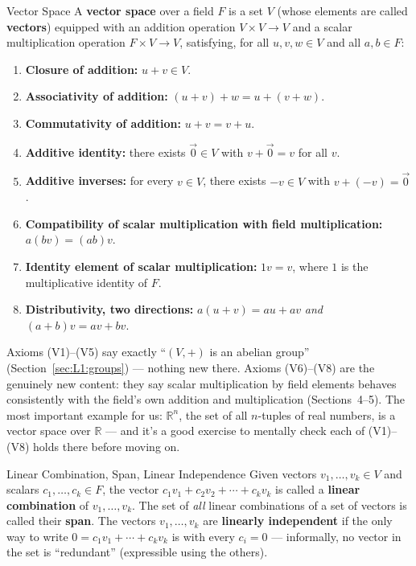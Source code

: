 \begin{defbox}{Vector Space}
A \textbf{vector space} over a field $F$ is a set $V$ (whose elements are called \textbf{vectors}) equipped with an addition operation $V \times V \to V$ and a scalar multiplication operation $F \times V \to V$, satisfying, for all $u,v,w \in V$ and all $a,b \in F$:
\begin{enumerate}[leftmargin=*, label=(V\arabic*)]
  \item \textbf{Closure of addition:} $u+v \in V$.
  \item \textbf{Associativity of addition:} $(u+v)+w = u+(v+w)$.
  \item \textbf{Commutativity of addition:} $u+v = v+u$.
  \item \textbf{Additive identity:} there exists $\vec 0 \in V$ with $v + \vec 0 = v$ for all $v$.
  \item \textbf{Additive inverses:} for every $v \in V$, there exists $-v \in V$ with $v+(-v) = \vec 0$.
  \item \textbf{Compatibility of scalar multiplication with field multiplication:} $a(bv) = (ab)v$.
  \item \textbf{Identity element of scalar multiplication:} $1v = v$, where $1$ is the multiplicative identity of $F$.
  \item \textbf{Distributivity, two directions:} $a(u+v) = au+av$ \emph{and} $(a+b)v = av+bv$.
\end{enumerate}
Axioms (V1)--(V5) say exactly ``$(V,+)$ is an abelian group'' (Section~\ref{sec:L1:groups}) --- nothing new there. Axioms (V6)--(V8) are the genuinely new content: they say scalar multiplication by field elements behaves consistently with the field's own addition and multiplication (Sections~4--5). The most important example for us: $\mathbb{R}^n$, the set of all $n$-tuples of real numbers, is a vector space over $\mathbb{R}$ --- and it's a good exercise to mentally check each of (V1)--(V8) holds there before moving on.
\end{defbox}

\begin{defbox}{Linear Combination, Span, Linear Independence}
Given vectors $v_1, \ldots, v_k \in V$ and scalars $c_1, \ldots, c_k \in F$, the vector $c_1 v_1 + c_2 v_2 + \cdots + c_k v_k$ is called a \textbf{linear combination} of $v_1, \ldots, v_k$. The set of \emph{all} linear combinations of a set of vectors is called their \textbf{span}. The vectors $v_1, \ldots, v_k$ are \textbf{linearly independent} if the only way to write $0 = c_1 v_1 + \cdots + c_k v_k$ is with every $c_i = 0$ --- informally, no vector in the set is ``redundant'' (expressible using the others).
\end{defbox}

